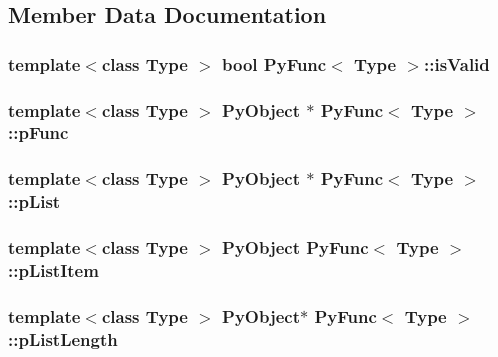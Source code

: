 \subsection{Member Data Documentation}
\hypertarget{classPyFunc_a6b9334f10ee479b14189e2bb7d9d4cc3}{
\subsubsection[{is\-Valid}]{\setlength{\rightskip}{0pt plus 5cm}template$<$class Type $>$ bool {\bf Py\-Func}$<$ Type $>$\-::is\-Valid\hspace{0.3cm}{\ttfamily [protected]}}}\label{classPyFunc_a6b9334f10ee479b14189e2bb7d9d4cc3}
\hypertarget{classPyFunc_a941eb18b7d22632c55b41652d79b0481}{
\subsubsection[{p\-Func}]{\setlength{\rightskip}{0pt plus 5cm}template$<$class Type $>$ Py\-Object $\ast$ {\bf Py\-Func}$<$ Type $>$\-::p\-Func\hspace{0.3cm}{\ttfamily [protected]}}}\label{classPyFunc_a941eb18b7d22632c55b41652d79b0481}
\hypertarget{classPyFunc_af3d520a4b2580b0ac96ad5ee9f745335}{
\subsubsection[{p\-List}]{\setlength{\rightskip}{0pt plus 5cm}template$<$class Type $>$ Py\-Object $\ast$ {\bf Py\-Func}$<$ Type $>$\-::p\-List\hspace{0.3cm}{\ttfamily [protected]}}}\label{classPyFunc_af3d520a4b2580b0ac96ad5ee9f745335}
\hypertarget{classPyFunc_afcc6a33961a461a500f5ea5b9d280e3e}{
\subsubsection[{p\-List\-Item}]{\setlength{\rightskip}{0pt plus 5cm}template$<$class Type $>$ Py\-Object {\bf Py\-Func}$<$ Type $>$\-::p\-List\-Item\hspace{0.3cm}{\ttfamily [protected]}}}\label{classPyFunc_afcc6a33961a461a500f5ea5b9d280e3e}
\hypertarget{classPyFunc_a9794285af7ee57f561e56685b374ff63}{
\subsubsection[{p\-List\-Length}]{\setlength{\rightskip}{0pt plus 5cm}template$<$class Type $>$ Py\-Object$\ast$ {\bf Py\-Func}$<$ Type $>$\-::p\-List\-Length\hspace{0.3cm}{\ttfamily [protected]}}}\label{classPyFunc_a9794285af7ee57f561e56685b374ff63}

